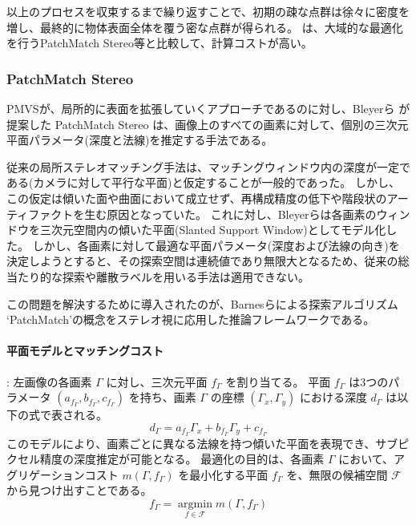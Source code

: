 以上のプロセスを収束するまで繰り返すことで、初期の疎な点群は徐々に密度を増し、最終的に物体表面全体を覆う密な点群が得られる。
\cite{Furukawa2010_PatchMVS} は、大域的な最適化を行うPatchMatch Stereo等と比較して、計算コストが高い。


\subsubsection{PatchMatch Stereo}

PMVSが、局所的に表面を拡張していくアプローチであるのに対し、Bleyerら\cite{Bleyer2011BMVC_PatchMatchStereo} が提案した PatchMatch Stereo は、画像上のすべての画素に対して、個別の三次元平面パラメータ(深度と法線)を推定する手法である。

従来の局所ステレオマッチング手法は、マッチングウィンドウ内の深度が一定である(カメラに対して平行な平面)と仮定することが一般的であった。
しかし、この仮定は傾いた面や曲面において成立せず、再構成精度の低下や階段状のアーティファクトを生む原因となっていた。
これに対し、Bleyerらは各画素のウィンドウを三次元空間内の傾いた平面(Slanted Support Window)としてモデル化した。
しかし、各画素に対して最適な平面パラメータ(深度および法線の向き)を決定しようとすると、その探索空間は連続値であり無限大となるため、従来の総当たり的な探索や離散ラベルを用いる手法は適用できない。

この問題を解決するために導入されたのが、Barnesらによる探索アルゴリズム `PatchMatch'\cite{Barnes2011_PatchMatch}の概念をステレオ視に応用した推論フレームワークである。

\paragraph{平面モデルとマッチングコスト}:
左画像の各画素 $\Gamma$ に対し、三次元平面 $f_\Gamma$ を割り当てる。
平面 $f_\Gamma$ は3つのパラメータ $(a_{f_\Gamma}, b_{f_\Gamma}, c_{f_\Gamma})$ を持ち、画素 $\Gamma$ の座標 $(\Gamma_x, \Gamma_y)$ における深度 $d_\Gamma$ は以下の式で表される。
\begin{equation}
    d_\Gamma = a_{f_\Gamma} \Gamma_x + b_{f_\Gamma} \Gamma_y + c_{f_\Gamma}
\end{equation}
このモデルにより、画素ごとに異なる法線を持つ傾いた平面を表現でき、サブピクセル精度の深度推定が可能となる。
最適化の目的は、各画素 $\Gamma$ において、アグリゲーションコスト $m(\Gamma, f_\Gamma)$ を最小化する平面 $f_\Gamma$ を、無限の候補空間 $\mathcal{F}$ から見つけ出すことである。
\begin{equation}
    f_\Gamma = \operatorname*{argmin}_{f \in \mathcal{F}} m(\Gamma, f_\Gamma)
\end{equation}

